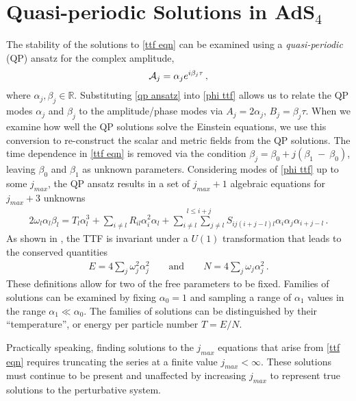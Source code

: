 \documentclass[../PhD.tex]{subfiles}
\begin{document}

\section{Quasi-periodic Solutions in AdS$_4$}
\label{sec: qp}

The stability of the solutions to \eqref{ttf eqn} can be examined using a \emph{quasi-periodic} (QP) ansatz for the complex amplitude,
\begin{align}
\label{qp ansatz}
\mathcal A_j = \alpha_j e^{i \beta_j \tau} \, ,
\end{align}
where $\alpha_j, \beta_j \in \mathbb{R}$. Substituting \eqref{qp ansatz} into \eqref{phi ttf} allows us to relate the QP modes $\alpha_j$ and $\beta_j$ to the amplitude/phase modes via $A_j = 2 \alpha_j$, $B_j = \beta_j \tau$. When we examine how well the QP solutions solve the Einstein equations, we use this conversion to re-construct the scalar and metric fields from the QP solutions. The time dependence in \eqref{ttf eqn} is removed via the condition $\beta_j = \beta_0 + j(\beta_1~-~\beta_0)$, leaving $\beta_0$ and $\beta_1$ as unknown parameters. Considering modes of \eqref{phi ttf} up to some $j_{max}$, the QP ansatz results in a set of $j_{max} + 1$ algebraic equations for $j_{max} + 3$ unknowns
\begin{align}
\label{qp eqn}
2 \omega_l \alpha_l \beta_l = T_l \alpha_l^3 + \sum_{i \neq l} R_{il} \alpha_i^2 \alpha_l + \stackrel{l \leq i + j}{\sum_{i \neq l} \sum_{j \neq l}} S_{ij(i+j-l)l} \alpha_i \alpha_j \alpha_{i+j-l} \, .
\end{align}
As shown in \cite{1507.08261, 1510.07836}, the TTF is invariant under a $U(1)$ transformation that leads to the conserved quantities
\begin{align}
\label{qp cons}
E = 4\sum_j \omega^2_j \alpha_j^2 \qquad \text{and} \qquad N= 4 \sum_j \omega_j \alpha_j^2 \, .
\end{align}
These definitions allow for two of the free parameters to be fixed. Families of solutions can be examined by fixing $\alpha_0 = 1$ and sampling a range of $\alpha_1$ values in the range $\alpha_1 \ll \alpha_0$. The families of solutions can be distinguished by their ``temperature'', or energy per particle number $T=E/N$. 

Practically speaking, finding solutions to the $j_{max}$ equations that arise from \eqref{ttf eqn} requires truncating the series at a finite value $j_{max} < \infty$. These solutions must continue to be present and unaffected by increasing $j_{max}$ to represent true solutions to the perturbative system. 
\end{document}
